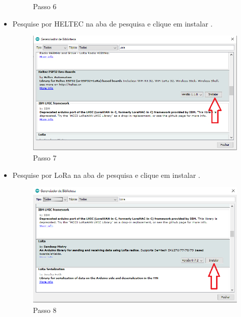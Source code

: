 \begin{itemize}
\begin{figure}[H]
  \caption{Passo 6}
  \label{fig:Download ide}
\end{figure}
\item Pesquise por HELTEC na aba de pesquisa e clique em instalar .
   \begin{figure}[H]
  \centering
  \includegraphics[scale=0.4]{Figuras/passo7.png}
  \caption{Passo 7}
  \label{fig:Download ide}
\end{figure}
\item Pesquise por LoRa na aba de pesquisa e clique em instalar .
   \begin{figure}[H]
  \centering
  \includegraphics[scale=0.4]{Figuras/passo8.png}
  \caption{Passo 8}
  \label{fig:Download ide}
\end{figure}


\end{itemize}

